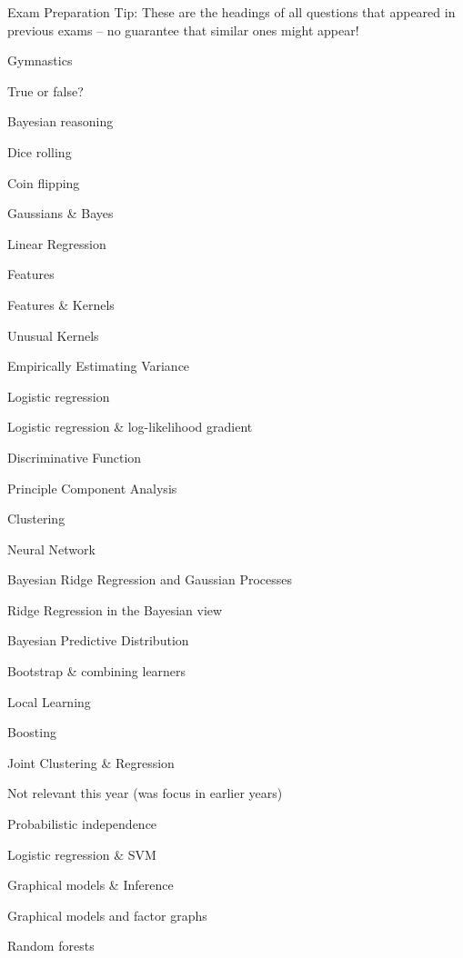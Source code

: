   \DefineShortVerb{\@}















\clearpage
Exam Preparation Tip: These are the headings of all questions that appeared in
previous exams -- no guarantee that similar ones might appear!

\begin{items}
\item Gymnastics
\item True or false?
\item Bayesian reasoning
\item Dice rolling
\item Coin flipping
\item Gaussians \& Bayes
\item Linear Regression
\item Features
\item Features \& Kernels
\item Unusual Kernels
\item Empirically Estimating Variance
\item Logistic regression
\item Logistic regression \& log-likelihood gradient
\item Discriminative Function
\item Principle Component Analysis
\item Clustering
\item Neural Network
\item Bayesian Ridge Regression and Gaussian Processes
\item Ridge Regression in the Bayesian view
\item Bayesian Predictive Distribution
\item Bootstrap \& combining learners
\item Local Learning
\item Boosting
\item Joint Clustering \& Regression
\end{items}

Not relevant this year (was focus in earlier years)
\begin{items}
\item Probabilistic independence
\item Logistic regression \& SVM
\item Graphical models \& Inference
\item Graphical models and factor graphs 
\item Random forests
\end{items}


\clearpage
{}
\printindex



